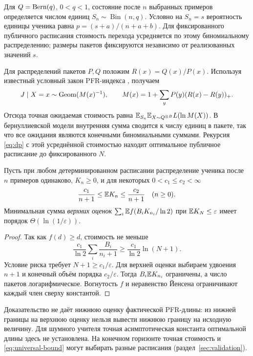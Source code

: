 Для $Q=\operatorname{Bern}(q)$, $0<q<1$, состояние после $n$ выбранных примеров определяется
числом единиц $S_n\sim\operatorname{Bin}(n,q)$. Условно на $S_n=s$
вероятность единицы ученика равна $p=(s+a)/(n+a+b)$.
Для фиксированного публичного расписания стоимость перехода усредняется по
этому биномиальному распределению; размеры пакетов фиксируются независимо
от реализованных значений $s$.

Для распределений пакетов $P,Q$ положим $R(x)=Q(x)/P(x)$. Используя известный
условный закон PFR-индекса \citep[формулы (34)--(38)]{qiu2026}, получаем
\begin{equation}
 J\mid X=x\sim\operatorname{Geom}(M(x)^{-1}),\qquad
 M(x)=1+\sum_y P(y)(R(x)-R(y))_+.
 \label{eq:conditional-index}
\end{equation}
Отсюда точная ожидаемая стоимость равна
$\mathbb E_{S_n}\mathbb E_{X\sim Q^{\otimes B}}L(\ln M(X))$.
В бернуллиевской модели внутренняя сумма сводится к числу единиц в пакете,
так что все ожидания являются конечными биномиальными суммами. Рекурсия
\eqref{eq:dp} с этой усреднённой стоимостью находит оптимальное публичное
расписание до фиксированного $N$.

\begin{proposition}
\label{prop:surrogate}
Пусть при любом детерминированном расписании распределение ученика после $n$
примеров одинаково, $K_n\ge0$, и для некоторых $0<c_1\le c_2<\infty$
\[
 \frac{c_1}{n+1}\le\mathbb E K_n\le\frac{c_2}{n+1}\quad(n\ge0).
\]
Минимальная сумма \emph{верхних оценок}
$\sum_i\mathbb E f(B_iK_{n_i}/\ln2)$ при $\mathbb E K_N\le\varepsilon$ имеет порядок
$\Theta(\ln(1/\varepsilon))$.
\end{proposition}
\begin{proof}
Так как $f(d)\ge d$, стоимость не меньше
\[
 \frac{c_1}{\ln2}\sum_i\frac{B_i}{n_i+1}
 \ge\frac{c_1}{\ln2}\ln(N+1).
\]
Условие риска требует $N+1\ge c_1/\varepsilon$. Для верхней оценки выбираем
удвоения $n+1$ и конечный объём порядка $c_2/\varepsilon$.
Тогда $B_i\mathbb E K_{n_i}$ ограничены, а число пакетов логарифмическое.
Вогнутость $f$ и неравенство Йенсена ограничивают каждый член сверху
константой.
\end{proof}

Доказательство не даёт нижнюю оценку фактической PFR-длины: из нижней
границы на верхнюю оценку нельзя вывести нижнюю границу на исходную величину.
Для шумного учителя точная асимптотическая константа оптимальной длины здесь
не установлена. На конечном горизонте точная стоимость и
\eqref{eq:universal-bound} могут выбирать разные расписания
(раздел~\ref{sec:validation}).
